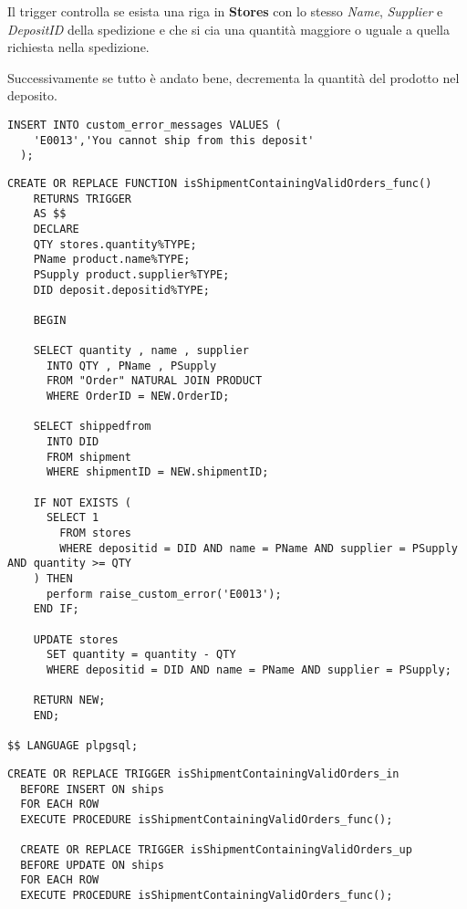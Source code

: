 Il trigger controlla se esista una riga in \textbf{Stores} con lo stesso \textit{Name}, \textit{Supplier} e \textit{DepositID} della spedizione e che si cia una quantità maggiore o uguale a quella richiesta nella spedizione.

Successivamente se tutto è andato bene, decrementa la quantità del prodotto nel deposito.

\begin{lstlisting}[caption={Creazione errore personalizzato per \textbf{isShipmentContainingValidOrders}}]
  INSERT INTO custom_error_messages VALUES (
    'E0013','You cannot ship from this deposit'
  );
\end{lstlisting}

\begin{lstlisting}[caption={Creazione funzione \textbf{isShipmentContainingValidOrders_func}}]
  CREATE OR REPLACE FUNCTION isShipmentContainingValidOrders_func()
    RETURNS TRIGGER
    AS $$
    DECLARE
    QTY stores.quantity%TYPE;
    PName product.name%TYPE;
    PSupply product.supplier%TYPE;
    DID deposit.depositid%TYPE;

    BEGIN 

    SELECT quantity , name , supplier 
      INTO QTY , PName , PSupply
      FROM "Order" NATURAL JOIN PRODUCT
      WHERE OrderID = NEW.OrderID;

    SELECT shippedfrom
      INTO DID
      FROM shipment
      WHERE shipmentID = NEW.shipmentID;

    IF NOT EXISTS (
      SELECT 1
        FROM stores
        WHERE depositid = DID AND name = PName AND supplier = PSupply AND quantity >= QTY
    ) THEN
      perform raise_custom_error('E0013');
    END IF;

    UPDATE stores
      SET quantity = quantity - QTY
      WHERE depositid = DID AND name = PName AND supplier = PSupply;

    RETURN NEW;
    END;

$$ LANGUAGE plpgsql;
\end{lstlisting}

\begin{lstlisting}[caption={Creazione trigger \textbf{isShipmentContainingValidOrders}}]
  CREATE OR REPLACE TRIGGER isShipmentContainingValidOrders_in
  BEFORE INSERT ON ships
  FOR EACH ROW
  EXECUTE PROCEDURE isShipmentContainingValidOrders_func();

  CREATE OR REPLACE TRIGGER isShipmentContainingValidOrders_up
  BEFORE UPDATE ON ships
  FOR EACH ROW
  EXECUTE PROCEDURE isShipmentContainingValidOrders_func();
\end{lstlisting}

